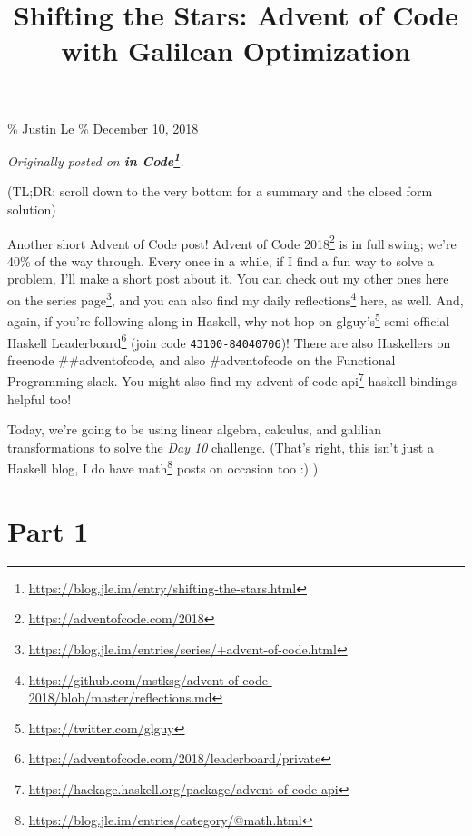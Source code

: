 \documentclass[]{article}
\title{Shifting the Stars: Advent of Code with Galilean Optimization}
\renewcommand{\href}[2]{#2\footnote{\url{#1}}}
\begin{document}
\maketitle

\% Justin Le \% December 10, 2018

\emph{Originally posted on
\textbf{\href{https://blog.jle.im/entry/shifting-the-stars.html}{in Code}}.}

(TL;DR: scroll down to the very bottom for a summary and the closed form
solution)

Another short Advent of Code post! \href{https://adventofcode.com/2018}{Advent
of Code 2018} is in full swing; we're 40\% of the way through. Every once in a
while, if I find a fun way to solve a problem, I'll make a short post about it.
You can check out my other ones
\href{https://blog.jle.im/entries/series/+advent-of-code.html}{here on the
series page}, and you can also find my
\href{https://github.com/mstksg/advent-of-code-2018/blob/master/reflections.md}{daily
reflections} here, as well. And, again, if you're following along in Haskell,
why not hop on \href{https://twitter.com/glguy}{glguy's} semi-official
\href{https://adventofcode.com/2018/leaderboard/private}{Haskell Leaderboard}
(join code \texttt{43100-84040706})! There are also Haskellers on freenode
\#\#adventofcode, and also \#adventofcode on the Functional Programming slack.
You might also find my
\href{https://hackage.haskell.org/package/advent-of-code-api}{advent of code
api} haskell bindings helpful too!

Today, we're going to be using linear algebra, calculus, and galilian
transformations to solve the \emph{Day 10} challenge. (That's right, this isn't
just a Haskell blog, I do have
\href{https://blog.jle.im/entries/category/@math.html}{math} posts on occasion
too :) )

\section{Part 1}\label{part-1}
\end{document}
